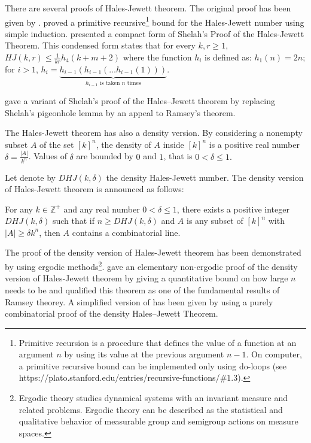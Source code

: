 There are several proofs of Hales-Jewett theorem. The original proof has been given by \cite{hales1987regularity}. \cite{shelah1988primitive} proved a primitive recursive\footnote{Primitive recursion is a procedure that defines the value of a function at an argument $n$ by using its value at the previous argument $n-1$.  On computer, a primitive recursive bound can be implemented only using do-loops (see https://plato.stanford.edu/entries/recursive-functions/$\#1.3$).} bound for the Hales-Jewett number using simple induction.
\cite{nilli1990shelah} presented a compact form of Shelah’s Proof of the Hales-Jewett Theorem.  This condensed form states that for every $k,r \geq 1$, $HJ(k,r) \leq \frac{1}{kr} h_4 (k+m+2)$ where  the function $h_i$ is defined as: $h_1(n)=2n$; for $i>1$, $h_i=\underbrace{h_{i-1}(h_{i-1}(\ldots h_{i-1}(1)))}_{h_{i-1} \text{ is taken } n \text{ times}} .$

 \cite{matet2007shelah} gave a variant of Shelah’s proof of the Hales–Jewett theorem by replacing Shelah’s pigeonhole lemma by an appeal to Ramsey’s theorem.

The Hales-Jewett theorem has also a density version. By considering a nonempty subset  $A$ of the set $[k]^n$, the density of $A$ inside $[k]^n$ is a positive real number $\delta=\frac{|A|}{k^n}$. Values of $\delta$ are bounded by $0$ and $1$, that is $0< \delta \leq 1.$ 

Let denote by $DHJ(k, \delta)$ the density Hales-Jewett number. The density version of Hales-Jewett theorem is announced as follows:

\begin{thm}   For any $k \in \mathbb{Z}^+$ and any real number $0< \delta \leq 1$,  there exists a positive integer $DHJ(k, \delta)$ such that if $n \geq DHJ(k,\delta)$ and $A$ is any subset of $[k] ^n$ with $|A| \geq \delta k^n$, then $A$ contains a combinatorial line.  \label{hj2}	\end{thm}

The proof of the density version of Hales-Jewett theorem has been demonstrated by \cite{furstenberg1991density} using ergodic methods\footnote{Ergodic theory studies dynamical systems with an invariant measure and related problems. Ergodic theory can be described as the statistical and qualitative behavior of measurable group and semigroup actions on measure spaces.}. \cite{polymath2012new} gave an elementary non-ergodic proof of the density version of Hales-Jewett theorem by giving a quantitative bound on how large $n$ needs to be and qualified this theorem as one of the fundamental results of Ramsey theorey. A simplified version of \cite{polymath2012new} has been given by \cite{dodos2013simple} using  a purely combinatorial proof of the density Hales–Jewett Theorem.

